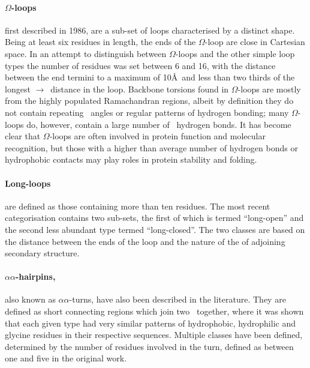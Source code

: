 \paragraph{$\Omega$-loops} first described in 1986\cite{STRUCTURE:Les86}, are a sub-set of loops characterised by a distinct shape. Being at least six residues in length, the ends of the $\Omega$-loop are close in Cartesian space. In an attempt to distinguish between $\Omega$-loops and the other simple loop types the number of residues was set between 6 and 16, with the distance between the end termini to a maximum of 10\AA\ and less than two thirds of the longest \ca$\rightarrow$\ca\ distance in the loop. Backbone torsions found in $\Omega$-loops are mostly from the highly populated Ramachandran regions, albeit by definition they do not contain repeating \phipsi\ angles or regular patterns of hydrogen bonding; many $\Omega$-loops do, however, contain a large number of \sidechain\ hydrogen bonds. It has become clear that $\Omega$-loops are often involved in protein function and molecular recognition, but those with a higher than average number of hydrogen bonds or hydrophobic contacts may play roles in protein stability and folding\cite{STRUCTURE:Fet95}. 

\paragraph{Long-loops} are defined as those containing more than ten residues. The most recent categorisation\cite{STRUCTURE:Mar95}  contains two sub-sets, the first of which is termed ``long-open'' and the second less abundant type termed ``long-closed''. The two classes are based on the distance between the ends of the loop and the nature of the of adjoining secondary structure.

\paragraph{$\alpha\alpha$-hairpins,} also known as $\alpha\alpha$-turns, have also been described in the literature\cite{STRUCTURE:Efi91,STRUCTURE:Win96}. They are defined as short connecting regions which join two \ahelixs\ together, where it was shown that each given type had very similar patterns of hydrophobic, hydrophilic and glycine residues in their respective sequences. Multiple classes have been defined, determined by the number of residues involved in the turn, defined as between one and five in the original work.

